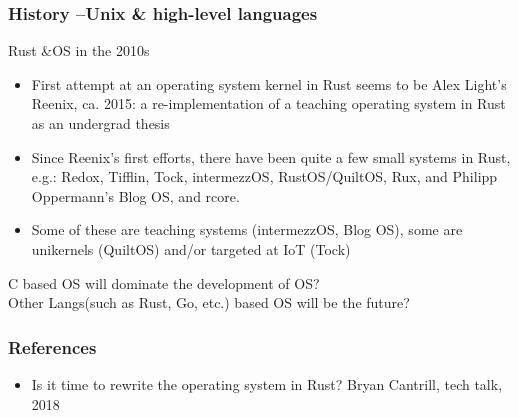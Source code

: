 \begin{frame}[plain]
	\frametitle{History --Unix \& high-level languages}
	
	Rust \&OS in the 2010s
	
	\begin{itemize}
		
		\item  First attempt at an operating system kernel in Rust seems to be
		Alex Light’s Reenix, ca. 2015: a re-implementation of a teaching
		operating system in Rust as an undergrad thesis
		
		
		\item  Since Reenix’s first efforts, there have been quite a few small
		systems in Rust, e.g.: Redox, Tifflin, Tock, intermezzOS,
		RustOS/QuiltOS, Rux, and Philipp Oppermann’s Blog OS, and rcore.
		
		\item Some of these are teaching systems (intermezzOS, Blog OS),
		some are unikernels (QuiltOS) and/or targeted at IoT (Tock)
		
		
	\end{itemize}
	\LARGE
	C based OS will dominate the development of OS?  \\
	Other Langs(such as Rust, Go, etc.) based OS will be the future?
\end{frame}

\begin{frame}[plain]
	\frametitle{References}

	\begin{itemize}
		
		\item Is it time to rewrite the operating system in Rust? Bryan Cantrill, tech talk, 2018
		
		
		
		
	\end{itemize}
	
	
\end{frame}

